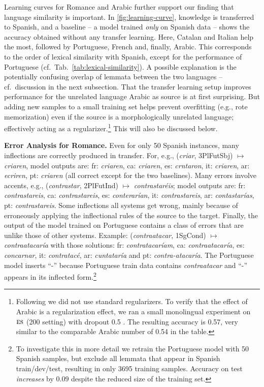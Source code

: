 \documentclass[11pt,letterpaper]{article}
\newcommand{\word}[1]{{\em #1}}
\newcommand{\mtag}[1]{{\small{\textsf{#1}}}}
\newcommand{\transftxt}[1]{$\text{\sc #1}$}
\def\tabref#1{Tab.~\ref{tab:#1}}
\begin{document}
Learning curves for Romance and Arabic further support our
finding that language similarity is important.  In
\cref{fig:learning-curve}, knowledge is transferred to
Spanish, and a baseline -- a model trained \textit{only} on
Spanish data -- shows the accuracy obtained without any
transfer learning.  Here, Catalan and Italian help the most,
followed by Portuguese, French and, finally, Arabic.  This
corresponds to the order of lexical similarity with Spanish,
except for the performance of Portuguese
(cf.\ \tabref{lexical-similarity}).  A possible explanation
is the potentially confusing overlap of lemmata between the
two languages -- cf.\ discussion in the next subsection.
That the transfer learning setup improves performance for
the unrelated language Arabic as source is at first
surprising. But adding new samples to a small training set
helps prevent overfitting (e.g., rote memorization) even if
the source is a morphologically unrelated language;
effectively acting as a regularizer.\footnote{Following
  \cite{kann2016med} we did not use standard regularizers.
To verify that the effect of Arabic is a regularization
effect, we ran a small monolingual 
experiment  on \transftxt{es} (200 setting)
 with dropout 0.5
\cite{srivastava2014dropout}. The resulting accuracy is
0.57, very similar to the comparable Arabic number of 0.54
in the table.}
This will also be discussed
below.

\textbf{Error Analysis for Romance.}
Even for only 50 Spanish
instances, many inflections are
correctly produced in transfer. 
For, e.g., (\word{criar}, \mtag{3PlFutSbj}) $\mapsto$
\word{criaren}, model outputs are: fr:
\word{criaren}, ca: \word{criaren}, es: \word{crntaron}, it:
\word{criaren}, ar: \word{ecriren}, pt: \word{criaren}
(all correct except for the two baselines).
Many errors involve
accents, e.g., (\word{contrastar}, \mtag{2PlFutInd}) $\mapsto$
\word{contrastar\'{e}is}; model outputs are: fr:
\word{contrastareis}, ca: \word{contrastareis}, es:
\word{conterar\'{i}an}, it: \word{contrastareis}, ar:
\word{contastar\'{i}as}, pt: \word{contrastareis}.  
Some inflections all systems get wrong, mainly because
of erroneously applying the inflectional rules of the source to the target.
Finally, the output of the model trained on Portuguese 
contains a class of errors that are unlike those of other systems.
Example:  (\word{contraatacar},
\mtag{1SgCond}) $\mapsto$ \word{contraatacar\'{i}a} with those
solutions: fr: \word{contratacar\'{i}am}, ca:
\word{contraatacar\'{i}a}, es: \word{concarnar}, it:
\word{contratac\'{e}}, ar: \word{cuntatar\'{i}a} and pt:
\word{contra-atacar\'{i}a}. 
The Portuguese model inserts
``-'' because Portuguese train data
contains \word{contraatacar} and ``-'' appears in its inflected
form.\footnote{To investigate this in more detail we retrain the Portuguese
model with 50 Spanish samples, but exclude all lemmata 
that appear in Spanish train/dev/test, resulting in only 3695 training samples.
Accuracy on test \emph{increases} by $0.09$ despite the
reduced size of the training set.}
\end{document}
